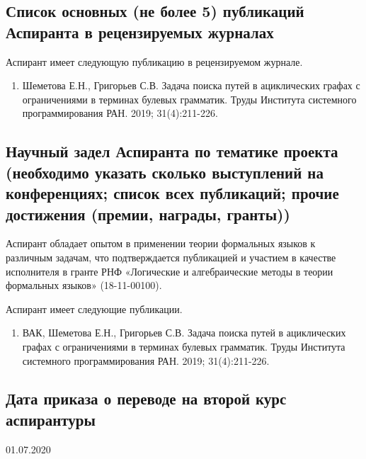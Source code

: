 \documentclass[12pt]{article}  %
\theoremstyle{remark}
\begin{document}
\subsection{Список основных (не более 5) публикаций Аспиранта в рецензируемых журналах}
Аспирант имеет следующую публикацию в рецензируемом журнале.
\begin{enumerate}
\item Шеметова Е.Н., Григорьев С.В. Задача поиска путей в ациклических графах с ограничениями в терминах булевых грамматик. Труды Института системного программирования РАН. 2019; 31(4):211-226.
\end{enumerate}
\subsection{Научный задел Аспиранта по тематике проекта (необходимо указать сколько выступлений на конференциях; список всех публикаций; прочие достижения (премии, награды, гранты))}
Аспирант обладает опытом в применении теории формальных языков к различным задачам, что подтверждается публикацией и участием в качестве исполнителя в гранте РНФ «Логические и алгебраические методы в теории формальных языков» (18-11-00100).

Аспирант имеет следующие публикации.

\begin{enumerate}
\item ВАК, Шеметова Е.Н., Григорьев С.В. Задача поиска путей в ациклических графах с ограничениями в терминах булевых грамматик. Труды Института системного программирования РАН. 2019; 31(4):211-226.
\end{enumerate}


\subsection{Дата приказа о переводе на второй курс аспирантуры}
01.07.2020
\end{document}
